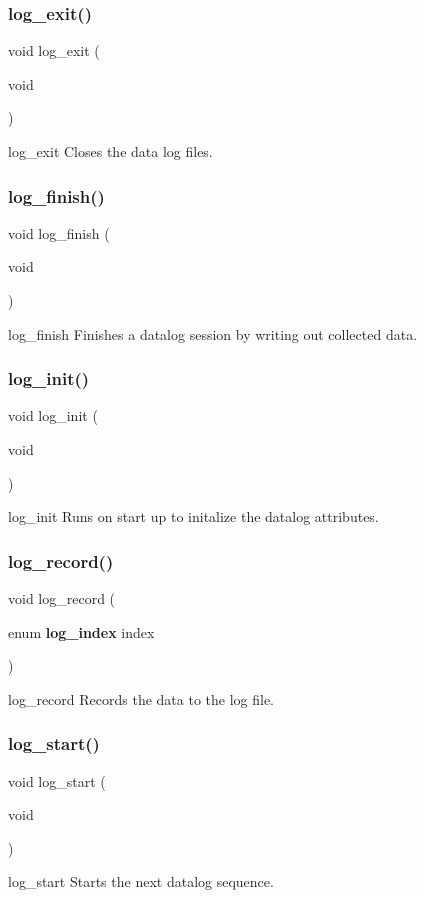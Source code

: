 \subsubsection{log\+\_\+exit()}
{\footnotesize\ttfamily void log\+\_\+exit (\begin{DoxyParamCaption}\item[{void}]{ }\end{DoxyParamCaption})}

log\+\_\+exit Closes the data log files. \mbox{\label{log_8c_afbd3419508e3dca941b60ca40f3ff6cd}} 
\subsubsection{log\+\_\+finish()}
{\footnotesize\ttfamily void log\+\_\+finish (\begin{DoxyParamCaption}\item[{void}]{ }\end{DoxyParamCaption})}

log\+\_\+finish Finishes a datalog session by writing out collected data. \mbox{\label{log_8c_a2508fad025e49f9746b6c178dce6917e}} 
\subsubsection{log\+\_\+init()}
{\footnotesize\ttfamily void log\+\_\+init (\begin{DoxyParamCaption}\item[{void}]{ }\end{DoxyParamCaption})}

log\+\_\+init Runs on start up to initalize the datalog attributes. \mbox{\label{log_8c_a93a87f7303b376ec092e84b52ca618a4}} 
\subsubsection{log\+\_\+record()}
{\footnotesize\ttfamily void log\+\_\+record (\begin{DoxyParamCaption}\item[{enum \textbf{ log\+\_\+index}}]{index }\end{DoxyParamCaption})}

log\+\_\+record Records the data to the log file. \mbox{\label{log_8c_a876e1f3e961256969160f51cb43b261e}} 
\subsubsection{log\+\_\+start()}
{\footnotesize\ttfamily void log\+\_\+start (\begin{DoxyParamCaption}\item[{void}]{ }\end{DoxyParamCaption})}

log\+\_\+start Starts the next datalog sequence. 
